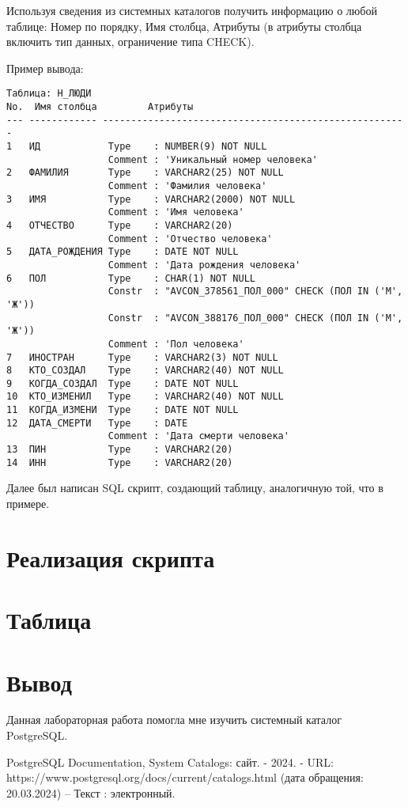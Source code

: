 \documentclass{article}
\begin{document}
Используя сведения из системных каталогов получить информацию о любой таблице: Номер по порядку, Имя столбца, Атрибуты (в атрибуты столбца включить тип данных, ограничение типа CHECK).

Пример вывода:
\begin{verbatim}
Таблица: Н_ЛЮДИ
No.  Имя столбца         Атрибуты
--- ------------ ------------------------------------------------------
1   ИД            Type    : NUMBER(9) NOT NULL
                  Comment : 'Уникальный номер человека'
2   ФАМИЛИЯ       Type    : VARCHAR2(25) NOT NULL
                  Comment : 'Фамилия человека'
3   ИМЯ           Type    : VARCHAR2(2000) NOT NULL
                  Comment : 'Имя человека'
4   ОТЧЕСТВО      Type    : VARCHAR2(20)  
                  Comment : 'Отчество человека'
5   ДАТА_РОЖДЕНИЯ Type    : DATE NOT NULL
                  Comment : 'Дата рождения человека'
6   ПОЛ           Type    : CHAR(1) NOT NULL
                  Constr  : "AVCON_378561_ПОЛ_000" CHECK (ПОЛ IN ('М', 'Ж'))
                  Constr  : "AVCON_388176_ПОЛ_000" CHECK (ПОЛ IN ('М', 'Ж'))
                  Comment : 'Пол человека'
7   ИНОСТРАН      Type    : VARCHAR2(3) NOT NULL
8   КТО_СОЗДАЛ    Type    : VARCHAR2(40) NOT NULL
9   КОГДА_СОЗДАЛ  Type    : DATE NOT NULL
10  КТО_ИЗМЕНИЛ   Type    : VARCHAR2(40) NOT NULL
11  КОГДА_ИЗМЕНИ  Type    : DATE NOT NULL
12  ДАТА_СМЕРТИ   Type    : DATE  
                  Comment : 'Дата смерти человека'
13  ПИН           Type    : VARCHAR2(20)  
14  ИНН           Type    : VARCHAR2(20)  
\end{verbatim}

Далее был написан SQL скрипт, создающий таблицу, аналогичную той, что в примере.



\section{Реализация скрипта}





\section{Таблица}



\section{Вывод}

Данная лабораторная работа помогла мне изучить системный каталог PostgreSQL.

\begin{thebibliography}{99}
        PostgreSQL Documentation, System Catalogs: сайт. - 2024. 
        - URL: https://www.postgresql.org/docs/current/catalogs.html (дата обращения: 20.03.2024) 
        – Текст : электронный.
\end{thebibliography}
\end{document}
